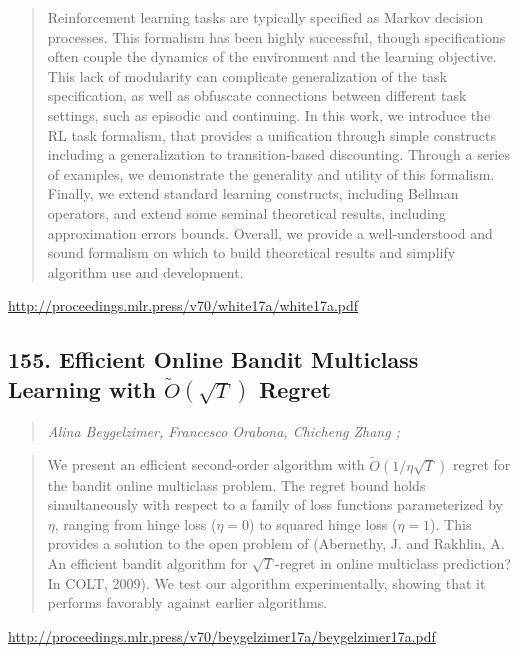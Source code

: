 \documentclass{article}
\begin{document}
\begin{quote}
    Reinforcement learning tasks are typically specified as Markov decision processes. This formalism has been highly successful, though specifications often couple the dynamics of the environment and the learning objective. This lack of modularity can complicate generalization of the task specification, as well as obfuscate connections between different task settings, such as episodic and continuing. In this work, we introduce the RL task formalism, that provides a unification through simple constructs including a generalization to transition-based discounting. Through a series of examples, we demonstrate the generality and utility of this formalism. Finally, we extend standard learning constructs, including Bellman operators, and extend some seminal theoretical results, including approximation errors bounds. Overall, we provide a well-understood and sound formalism on which to build theoretical results and simplify algorithm use and development.  
\end{quote}

\href{http://proceedings.mlr.press/v70/white17a/white17a.pdf}{http://proceedings.mlr.press/v70/white17a/white17a.pdf}

\subsection{155. Efficient Online Bandit Multiclass Learning with $\tilde{O}(\sqrt{T})$ Regret}

\begin{quote}
\footnotesize{\textit{Alina Beygelzimer, Francesco Orabona, Chicheng Zhang ;}}

\end{quote}

\begin{quote}
    We present an efficient second-order algorithm with $\tilde{O}(1/\eta \sqrt{T})$ regret for the bandit online multiclass problem. The regret bound holds simultaneously with respect to a family of loss functions parameterized by $\eta$, ranging from hinge loss ($\eta=0$) to squared hinge loss ($\eta=1$). This provides a solution to the open problem of (Abernethy, J. and Rakhlin, A. An efficient bandit algorithm for $\sqrt{T}$-regret in online multiclass prediction? In COLT, 2009). We test our algorithm experimentally, showing that it performs favorably against earlier algorithms.  
\end{quote}

\href{http://proceedings.mlr.press/v70/beygelzimer17a/beygelzimer17a.pdf}{http://proceedings.mlr.press/v70/beygelzimer17a/beygelzimer17a.pdf}
\end{document}
